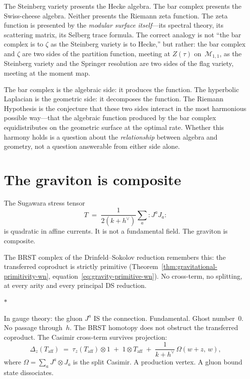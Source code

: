 \documentclass[11pt]{article}
\newcommand{\cM}{\mathcal{M}}
\newcommand{\normord}[1]{:\!#1\!:}
\newcommand{\sep}{\bigskip\begin{center}$*$\end{center}\medskip}
\begin{document}
The Steinberg variety presents the Hecke algebra.  The bar
complex presents the Swiss-cheese algebra.  Neither presents
the Riemann zeta function.  The zeta function is presented
by the \emph{modular surface itself}---its spectral theory,
its scattering matrix, its Selberg trace formula.  The
correct analogy is not ``the bar complex is to $\zeta$ as the
Steinberg variety is to Hecke,'' but rather: the bar complex
and $\zeta$ are two sides of the partition function, meeting
at $Z(\tau)$ on~$\cM_{1,1}$, as the Steinberg variety and the
Springer resolution are two sides of the flag variety, meeting
at the moment map.

The bar complex is the algebraic side: it produces the
function.  The hyperbolic Laplacian is the geometric side: it
decomposes the function.  The Riemann Hypothesis is the
conjecture that these two sides interact in the most
harmonious possible way---that the algebraic function
produced by the bar complex equidistributes on the geometric
surface at the optimal rate.  Whether this harmony holds is a
question about the \emph{relationship} between algebra and
geometry, not a question answerable from either side alone.


\section{The graviton is composite}
\label{sec:graviton-composite}

The Sugawara stress tensor
\[
T \;=\; \frac{1}{2(k+h^\vee)}\sum_a \normord{J^a J_a}
\]
is quadratic in affine currents.  It is not a fundamental field.
The graviton is composite.

The BRST complex of the Drinfeld--Sokolov reduction remembers
this: the transferred coproduct is strictly primitive
(Theorem~\ref{thm:gravitational-primitivity-wn},
equation~\eqref{eq:gravity-primitive-wn}).  No cross-term, no
splitting, at every arity and every principal DS reduction.

\sep

In gauge theory: the gluon $J^a$ IS the connection.
Fundamental.  Ghost number~$0$.  No passage through~$h$.  The
BRST homotopy does not obstruct the transferred coproduct.
The Casimir cross-term survives projection:
\[
\Delta_z(T_{\mathrm{aff}})
\;=\;
\tau_z(T_{\mathrm{aff}}) \otimes 1
\;+\; 1 \otimes T_{\mathrm{aff}}
\;+\; \frac{1}{k+h^\vee}\,\Omega(w{+}z,\, w),
\]
where $\Omega = \sum_a J^a \otimes J_a$ is the split Casimir.
A production vertex.  A gluon bound state dissociates.
\end{document}
